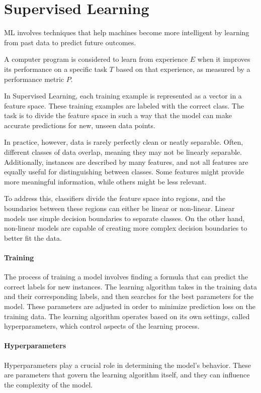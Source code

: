\section{Supervised Learning}

ML involves techniques that help machines become more intelligent by learning from past data to predict future outcomes.
\begin{definition}
    A computer program is considered to learn from experience $E$ when it improves its performance on a specific task $T$ based on that experience, as measured by a performance metric $P$.
\end{definition}

In Supervised Learning, each training example is represented as a vector in a feature space. 
These training examples are labeled with the correct class. 
The task is to divide the feature space in such a way that the model can make accurate predictions for new, unseen data points.

In practice, however, data is rarely perfectly clean or neatly separable. 
Often, different classes of data overlap, meaning they may not be linearly separable. 
Additionally, instances are described by many features, and not all features are equally useful for distinguishing between classes. 
Some features might provide more meaningful information, while others might be less relevant.

To address this, classifiers divide the feature space into regions, and the boundaries between these regions can either be linear or non-linear. 
Linear models use simple decision boundaries to separate classes. 
On the other hand, non-linear models are capable of creating more complex decision boundaries to better fit the data.

\paragraph*{Training}
The process of training a model involves finding a formula that can predict the correct labels for new instances. 
The learning algorithm takes in the training data and their corresponding labels, and then searches for the best parameters for the model. 
These parameters are adjusted in order to minimize prediction loss on the training data.
The learning algorithm operates based on its own settings, called hyperparameters, which control aspects of the learning process.

\paragraph*{Hyperparameters}
Hyperparameters play a crucial role in determining the model's behavior. 
These are parameters that govern the learning algorithm itself, and they can influence the complexity of the model. 

